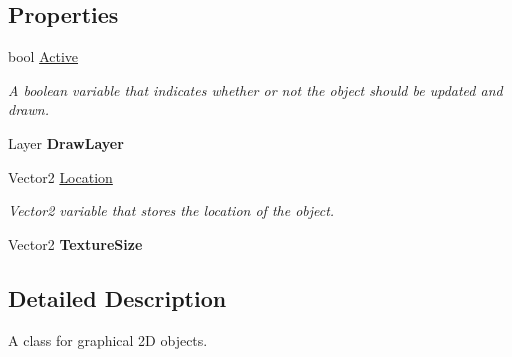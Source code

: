\subsection*{Properties}
\begin{DoxyCompactItemize}
\item 
\hypertarget{classwp__engine_1_1_object_a9b8c2e5191f6aa6971e82045e1dc4746}{bool \hyperlink{classwp__engine_1_1_object_a9b8c2e5191f6aa6971e82045e1dc4746}{Active}}\label{classwp__engine_1_1_object_a9b8c2e5191f6aa6971e82045e1dc4746}

\begin{DoxyCompactList}\small\item\em A boolean variable that indicates whether or not the object should be updated and drawn. \end{DoxyCompactList}\item 
\hypertarget{classwp__engine_1_1_object_afb350e018ecade6b4869c617cf575d87}{Layer {\bfseries Draw\-Layer}}\label{classwp__engine_1_1_object_afb350e018ecade6b4869c617cf575d87}

\item 
\hypertarget{classwp__engine_1_1_object_a04fc1210463e5919b256c3bb56640eff}{Vector2 \hyperlink{classwp__engine_1_1_object_a04fc1210463e5919b256c3bb56640eff}{Location}}\label{classwp__engine_1_1_object_a04fc1210463e5919b256c3bb56640eff}

\begin{DoxyCompactList}\small\item\em Vector2 variable that stores the location of the object. \end{DoxyCompactList}\item 
\hypertarget{classwp__engine_1_1_object_a56bc69f58db1ef0e759c28a370328fab}{Vector2 {\bfseries Texture\-Size}}\label{classwp__engine_1_1_object_a56bc69f58db1ef0e759c28a370328fab}

\end{DoxyCompactItemize}


\subsection{Detailed Description}
A class for graphical 2\-D objects. 

